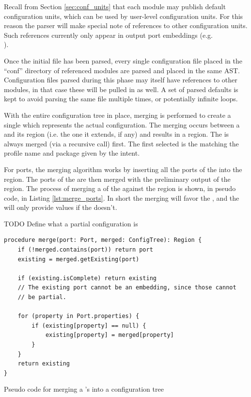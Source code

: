 Recall from Section \ref{sec:conf_units} that each module may publish default
configuration units, which can be used by user-level configuration units. For
this reason the parser will make special note of references to other
configuration units. Such references currently only appear in output port
embeddings (e.g. \\).

Once the initial file has been parsed, every single configuration file placed
in the ``conf'' directory of referenced modules are parsed and placed in the
same AST. Configuration files parsed during this phase may itself have
references to other modules, in that case these will be pulled in as well.  A
set of parsed defaults is kept to avoid parsing the same file multiple times,
or potentially infinite loops.


With the entire configuration tree in place, merging is performed to create a
single  which represents the actual configuration. The merging
occurs between a  and its  region (i.e. the one it
extends, if any) and results in a  region. The  is
always merged (via a recursive call) first. The first  selected is
the  matching the profile name and package given by the intent.

For ports, the merging algorithm works by inserting all the ports of the
 into the  region. The ports of the  are
then merged with the preliminary output of the  region. The
process of merging a  of the  against the 
region is shown, in pseudo code, in Listing \ref{lst:merge_ports}. In short the
merging will favor the , and the  will only provide
values if the  doesn't.

TODO Define what a partial configuration is

\begin{listing}[H]
\begin{verbatim}
procedure merge(port: Port, merged: ConfigTree): Region {
    if (!merged.contains(port)) return port
    existing = merged.getExisting(port)

    if (existing.isComplete) return existing
    // The existing port cannot be an embedding, since those cannot
    // be partial.

    for (property in Port.properties) {
        if (existing[property] == null) {
            existing[property] = merged[property]
        }
    }
    return existing
}
\end{verbatim}

\caption{Pseudo code for merging a 's  into a
     configuration tree}

\label{lst:merge_ports}

\end{listing}

